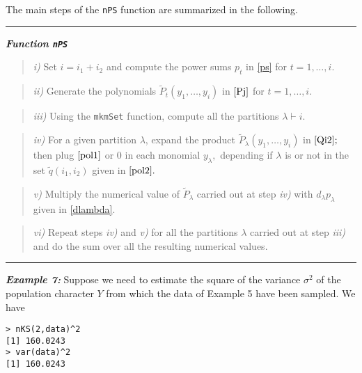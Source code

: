 \hskip-0.5cm The main steps of the \texttt{nPS} function are summarized
in the following.

\noindent

\rule{13cm}{0.4pt}

\textbf{\emph{Function \texttt{nPS}}}

\begin{quote}
\emph{i)} Set \(i=i_1+i_2\) and compute the power sums \(p_t\) in
\eqref{ps} for \(t=1, \ldots,i.\)
\end{quote}

\begin{quote}
\emph{ii)} Generate the polynomials \(\tilde{P}_{t}(y_1, \ldots, y_i)\)
in \(\eqref{Pj}\) for \(t=1, \ldots, i.\)
\end{quote}

\begin{quote}
\emph{iii)} Using the \texttt{mkmSet} function, compute all the
partitions \(\lambda \vdash i.\)
\end{quote}

\begin{quote}
\emph{iv)} For a given partition \(\lambda\), expand the product
\(\tilde{P}_{\lambda}(y_1, \ldots, y_i)\) in \(\eqref{Qi2};\) then plug
\(\eqref{pol1}\) or \(0\) in each monomial \(y_{\lambda},\) depending if
\(\lambda\) is or not in the set \(\tilde{q}(i_1,i_2)\) given in
\(\eqref{pol2}.\)
\end{quote}

\begin{quote}
\emph{v)} Multiply the numerical value of \(\tilde{P}_{\lambda}\)
carried out at step \emph{iv)} with \(d_{\lambda} p_{\lambda}\) given in
\eqref{dlambda}.
\end{quote}

\begin{quote}
\emph{vi)} Repeat steps \emph{iv)} and \emph{v)} for all the partitions
\(\lambda\) carried out at step \emph{iii)} and do the sum over all the
resulting numerical values.
\end{quote}

\noindent

\rule{13cm}{0.4pt}

\hskip-0.5cm\textbf{\emph{Example 7:}} Suppose we need to estimate the
square of the variance \(\sigma^2\) of the population character \(Y\)
from which the data of Example 5 have been sampled. We have

\begin{verbatim}
> nKS(2,data)^2
[1] 160.0243
> var(data)^2
[1] 160.0243
\end{verbatim}

